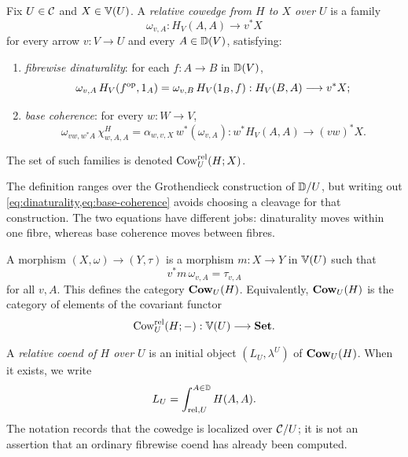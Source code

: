 \begin{definition}
\label{def:relative-cowedge}
Fix \(U\in\mathcal{C}\) and \(X\in\mathbb{V}(U)\).  A \emph{relative cowedge from \(H\) to
\(X\) over \(U\)} is a family
\begin{equation}
  \omega_{v,A}:H_V(A,A)\longrightarrow v^*X
  \label{eq:cow-component}
\end{equation}
for every arrow \(v:V\to U\) and every \(A\in\mathbb{D}(V)\), satisfying:
\begin{enumerate}[label=(C\arabic*)]
  \item \emph{fibrewise dinaturality}: for each \(f:A\to B\) in
  \(\mathbb{D}(V)\),
  \begin{equation}
    \omega_{v,A}\,H_V(f^{\mathrm{op}},1_A)
    =
    \omega_{v,B}\,H_V(1_B,f)
    :H_V(B,A)\longrightarrow v^*X;
    \label{eq:dinaturality}
  \end{equation}
  \item \emph{base coherence}: for every \(w:W\to V\),
  \begin{equation}
    \omega_{vw,w^*A}\,\chi^H_{w,A,A}
    =
    \alpha_{w,v,X}\,w^*(\omega_{v,A})
    :w^*H_V(A,A)\longrightarrow(vw)^*X.
    \label{eq:base-coherence}
  \end{equation}
\end{enumerate}
The set of such families is denoted \(\operatorname{Cow}^{\mathrm{rel}}_U(H;X)\).
\end{definition}

The definition ranges over the Grothendieck construction of \(\mathbb{D}/U\), but
writing out \cref{eq:dinaturality,eq:base-coherence} avoids choosing a
cleavage for that construction.  The two equations have different jobs:
dinaturality moves within one fibre, whereas base coherence moves between
fibres.

A morphism \((X,\omega)\to(Y,\tau)\) is a morphism \(m:X\to Y\) in
\(\mathbb{V}(U)\) such that
\[
  v^*m\,\omega_{v,A}=\tau_{v,A}
\]
for all \(v,A\).  This defines the category \(\mathbf{Cow}_U(H)\).  Equivalently,
\(\mathbf{Cow}_U(H)\) is the category of elements of the covariant functor
\[
  \operatorname{Cow}^{\mathrm{rel}}_U(H;-):\mathbb{V}(U)\longrightarrow\mathbf{Set}.
\]

\begin{definition}
\label{def:relative-coend}
A \emph{relative coend of \(H\) over \(U\)} is an initial object
\((L_U,\lambda^U)\) of \(\mathbf{Cow}_U(H)\).  When it exists, we write
\[
  L_U=\mathop{\int^{A\in\mathbb{D}}_{\mathrm{rel},U}} H(A,A).
\]
The notation records that the cowedge is localized over \(\mathcal{C}/U\); it is not
an assertion that an ordinary fibrewise coend has already been computed.
\end{definition}

